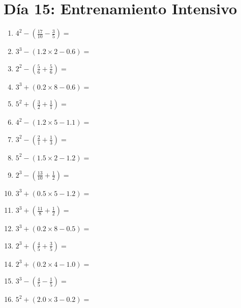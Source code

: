 \documentclass[12pt]{article}
\begin{document}
\section*{Día 15: Entrenamiento Intensivo}
\begin{enumerate}
\item \large $ 4^{2} - (\frac{17}{10} - \frac{3}{5}) = $ \vspace{1.6cm}
\item \large $ 3^{3} - (1.2 \times 2 - 0.6) = $ \vspace{1.6cm}
\item \large $ 2^{2} - (\frac{5}{6} + \frac{5}{6}) = $ \vspace{1.6cm}
\item \large $ 3^{3} + (0.2 \times 8 - 0.6) = $ \vspace{1.6cm}
\item \large $ 5^{2} + (\frac{3}{2} + \frac{1}{1}) = $ \vspace{1.6cm}
\item \large $ 4^{2} - (1.2 \times 5 - 1.1) = $ \vspace{1.6cm}
\item \large $ 3^{2} - (\frac{2}{1} + \frac{1}{3}) = $ \vspace{1.6cm}
\item \large $ 5^{2} - (1.5 \times 2 - 1.2) = $ \vspace{1.6cm}
\item \large $ 2^{3} - (\frac{13}{10} + \frac{1}{2}) = $ \vspace{1.6cm}
\item \large $ 3^{3} + (0.5 \times 5 - 1.2) = $ \vspace{1.6cm}
\newpage
\item \large $ 3^{3} + (\frac{11}{8} + \frac{1}{2}) = $ \vspace{1.6cm}
\item \large $ 3^{3} + (0.2 \times 8 - 0.5) = $ \vspace{1.6cm}
\item \large $ 2^{3} + (\frac{4}{5} + \frac{3}{5}) = $ \vspace{1.6cm}
\item \large $ 2^{3} + (0.2 \times 4 - 1.0) = $ \vspace{1.6cm}
\item \large $ 3^{3} - (\frac{4}{5} - \frac{1}{5}) = $ \vspace{1.6cm}
\item \large $ 5^{2} + (2.0 \times 3 - 0.2) = $ \vspace{1.6cm}

\end{enumerate}
\end{document}
